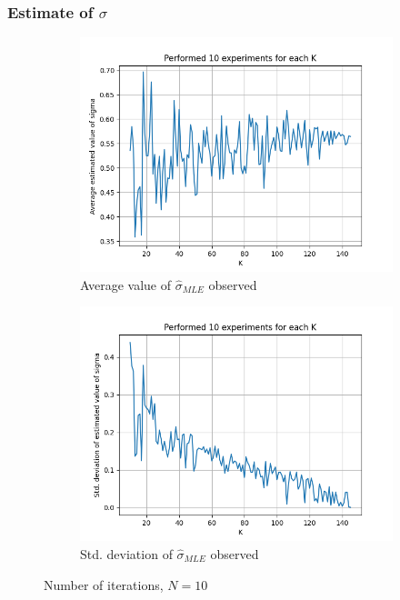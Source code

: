 \documentclass[fleqn, 11pt]{article}
\begin{document}
\subsubsection{Estimate of $\sigma$}
\begin{figure}[H]
    \centering
    \begin{subfigure}[H]{0.49\textwidth}
        \centering
        \includegraphics[width=\textwidth]{P1/sigma/avgs_10.png}
        \caption[]{Average value of $\hat{\sigma}_{MLE}$ observed}
    \end{subfigure}
    \begin{subfigure}[H]{0.49\textwidth}
        \centering
        \includegraphics[width=\textwidth]{P1/sigma/stds_10.png}
        \caption[]{Std. deviation of $\hat{\sigma}_{MLE}$ observed}
    \end{subfigure}
    \caption{Number of iterations, $N = 10$}
\end{figure}
\end{document}

